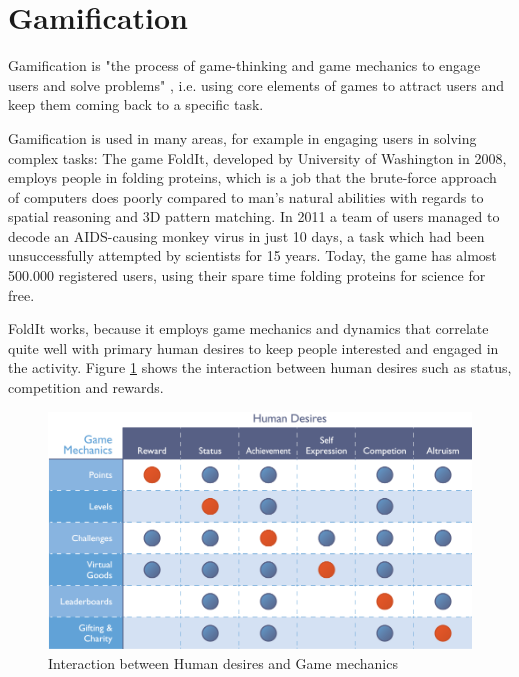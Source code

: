\section{Gamification}\label{sec:gamification}
Gamification is "the process of game-thinking and game mechanics to engage users and solve problems" \cite{Zichermann2011}, i.e. using core elements of games to attract users and keep them coming back to a specific task.

Gamification is used in many areas, for example in engaging users in solving complex tasks: The game FoldIt, developed by University of Washington in 2008, employs people in folding proteins, which is a job that the brute-force approach of computers does poorly compared to man's natural abilities with regards to spatial reasoning and 3D pattern matching. In 2011 a team of users managed to decode an AIDS-causing monkey virus in just 10 days, a task which had been unsuccessfully attempted by scientists for 15 years.\cite{Huff2011} Today, the game has almost 500.000 registered users, using their spare time folding proteins for science for free.\cite{FoldIt2013}

FoldIt works, because it employs game mechanics and dynamics that correlate quite well with primary human desires to keep people interested and engaged in the activity.
Figure \ref{fig:bunchball} shows the interaction between human desires such as status, competition and rewards.

\begin{figure}[hptb]
  \centering
    \includegraphics[width=\textwidth]{img/bunchball.png}
  \caption{Interaction between Human desires and Game mechanics}
  \label{fig:bunchball}
\end{figure}

